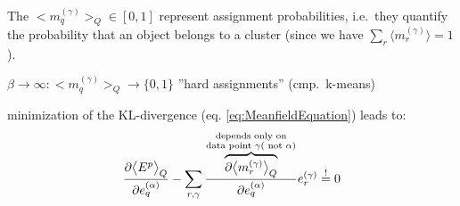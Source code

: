 The $\big< m_q^{(\gamma)} \big>_Q \in [0, 1]$ represent assignment
probabilities, i.e.\ they quantify the probability that an object
belongs to a cluster (since we have $\sum_r \langle m_r^{(\gamma)} \rangle = 1$).
\begin{itemize}
	\itl $\beta \rightarrow \infty: \big< m_q^{(\gamma)} \big>_Q
		\rightarrow \{0, 1\}$ ''hard assignments'' (cmp.\ k-means)
\end{itemize}
minimization of the KL-divergence (eq. \ref{eq:MeanfieldEquation}) leads to:
\begin{equation}
	\frac{\partial \big< E^p \big>_Q}{\partial e_q^{(\alpha)}}
	- \sum\limits_{r, \gamma} \frac{
		\overbrace{ \partial \big< m_r^{(\gamma)} \big>_Q }^{
			\substack{	\text{depends only on} \\
					\text{data point } \gamma (\text{ not } \alpha)}}}{
			\partial e_q^{(\alpha)}}
		e_r^{(\gamma)} \stackrel{\mathrm{!}}{=} 0
\end{equation}
